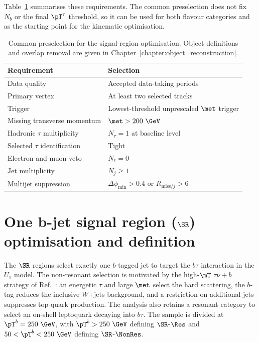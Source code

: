 Table~\ref{tab:ch7_preselection} summarises these requirements.
The common preselection does not fix $N_b$ or the final $\pT^\tau$ threshold, so it can be used for both flavour categories and as the starting point for the kinematic optimisation.

\begin{table}[htbp]
    \centering
    \caption{Common preselection for the signal-region optimisation. Object definitions and overlap removal are given in Chapter~\ref{chapter:object_reconstruction}.}
    \label{tab:ch7_preselection}
    \begin{tabular}{ll}
        \toprule
        Requirement & Selection \\
        \midrule
        Data quality & Accepted data-taking periods \\
        Primary vertex & At least two selected tracks \\
        Trigger & Lowest-threshold unprescaled $\met$ trigger \\
        Missing transverse momentum & $\met>200~\GeV$ \\
        Hadronic $\tau$ multiplicity & $N_\tau=1$ at baseline level \\
        Selected $\tau$ identification & Tight \\
        Electron and muon veto & $N_\ell=0$ \\
        Jet multiplicity & $N_j\geq1$ \\
        Multijet suppression & $\Delta\phi_{\min}>0.4$ or $R_{\mathrm{miss}/j}>6$ \\
        \bottomrule
    \end{tabular}
\end{table}

\section[One b-jet signal region (SR1b) optimisation and definition]{One b-jet signal region ($\SR$) optimisation and definition}
\label{sec:ch7_sr1b}

The $\SR$ regions select exactly one $b$-tagged jet to target the $b\tau$ interaction in the $U_1$ model.
The non-resonant selection is motivated by the high-$\mT$ $\tau\nu+b$ strategy of Ref.~\cite{Endo2022NonResonant}: an energetic $\tau$ and large $\met$ select the hard scattering, the $b$-tag reduces the inclusive $W$+jets background, and a restriction on additional jets suppresses top-quark production.
The analysis also retains a resonant category to select an on-shell leptoquark decaying into $b\tau$.
The sample is divided at $\pT^b=250~\GeV$, with $\pT^b>250~\GeV$ defining $\SR$-$\Res$ and $50<\pT^b<250~\GeV$ defining $\SR$-$\NonRes$.

